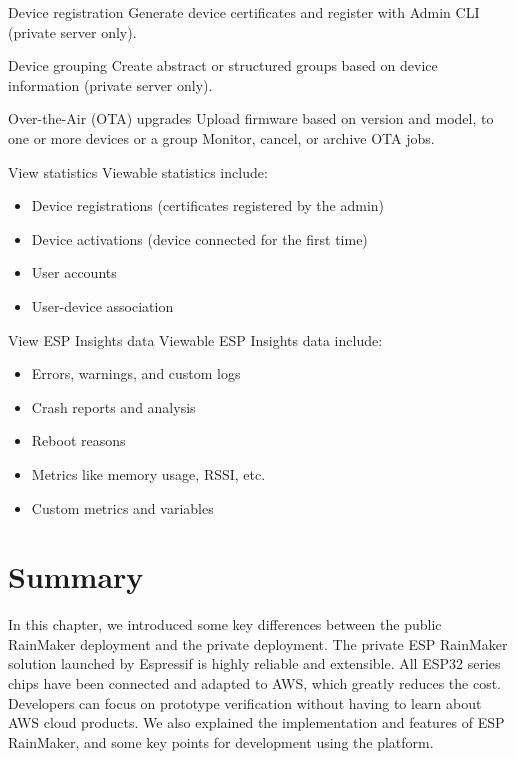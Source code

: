 \documentclass[a4paper,12pt]{book}
\begin{document}
\begin{term}{Device registration}
    Generate device certificates and register with Admin CLI (private server only).
\end{term}

\begin{term}{Device grouping}
    Create abstract or structured groups based on device information (private server only).
\end{term}

\begin{term}{Over-the-Air (OTA) upgrades}
    Upload firmware based on version and model, to one or more devices or a group Monitor, cancel, or archive OTA jobs.
\end{term}

\begin{term}{View statistics}
    Viewable statistics include:
    \begin{itemize}
        \item Device registrations (certificates registered by the admin)
        \item Device activations (device connected for the first time)
        \item User accounts
        \item User-device association
    \end{itemize}
\end{term}

\begin{term}{View ESP Insights data}
    Viewable ESP Insights data include:
    \begin{itemize}
        \item Errors, warnings, and custom logs
        \item Crash reports and analysis
        \item Reboot reasons
        \item Metrics like memory usage, RSSI, etc.
        \item Custom metrics and variables
    \end{itemize}
\end{term}

\section{Summary}
In this chapter, we introduced some key differences between the public RainMaker deployment and the private deployment. The private ESP RainMaker solution launched by Espressif is highly reliable and extensible. All ESP32 series chips have been connected and adapted to AWS, which greatly reduces the cost. Developers can focus on prototype verification without having to learn about AWS cloud products. We also explained the implementation and features of ESP RainMaker, and some key points for development using the platform.
\end{document}
